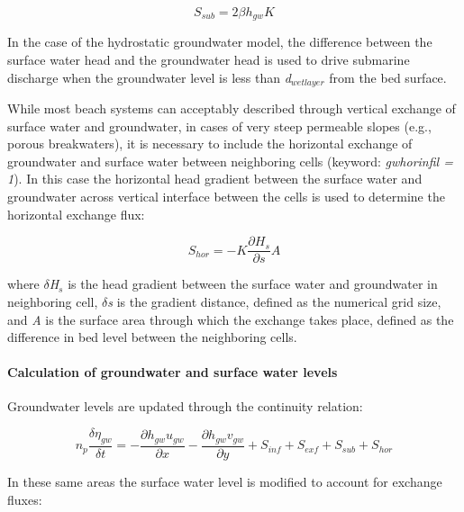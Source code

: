 \documentclass{article}
\begin{document}
\noindent 
\begin{equation} \label{2.72)} 
S_{sub} =2\beta h_{gw} K 
\end{equation} 


\noindent In the case of the hydrostatic groundwater model, the difference between the surface water head and the groundwater head is used to drive submarine discharge when the groundwater level is less than \textit{d${}_{wetlayer}$} from the bed surface. 

\noindent 

\noindent While most beach systems can acceptably described through vertical exchange of surface water and groundwater, in cases of very steep permeable slopes (e.g., porous breakwaters), it is necessary to include the horizontal exchange of groundwater and surface water between neighboring cells (keyword: \textit{gwhorinfil = 1}). In this case the horizontal head gradient between the surface water and groundwater across vertical interface between the cells is used to determine the horizontal exchange flux:

\noindent 
\begin{equation} \label{2.73)} 
S_{hor} =-K\frac{\partial H_{s} }{\partial s} A 
\end{equation} 


\noindent where \textit{$\delta $H${}_{s}$} is the head gradient between the surface water and groundwater in neighboring cell, \textit{$\delta $s} is the gradient distance, defined as the numerical grid size, and \textit{A} is the surface area through which the exchange takes place, defined as the difference in bed level between the neighboring cells.


\paragraph{ Calculation of groundwater and surface water levels}

\noindent Groundwater levels are updated through the continuity relation:

\noindent 
\begin{equation} \label{2.74)} 
n_{p} \frac{\delta \eta _{gw} }{\delta t} =-\frac{\partial h_{gw} u_{gw} }{\partial x} -\frac{\partial h_{gw} v_{gw} }{\partial y} +S_{inf} +S_{exf} +S_{sub} +S_{hor}  
\end{equation} 


\noindent In these same areas the surface water level is modified to account for exchange fluxes:
\end{document}
